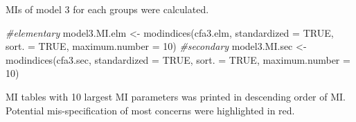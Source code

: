 \documentclass[
]{article}
\newenvironment{Shaded}{\begin{snugshade}}{\end{snugshade}}
\newcommand{\AttributeTok}[1]{\textcolor[rgb]{0.77,0.63,0.00}{#1}}
\newcommand{\CommentTok}[1]{\textcolor[rgb]{0.56,0.35,0.01}{\textit{#1}}}
\newcommand{\ConstantTok}[1]{\textcolor[rgb]{0.00,0.00,0.00}{#1}}
\newcommand{\DecValTok}[1]{\textcolor[rgb]{0.00,0.00,0.81}{#1}}
\newcommand{\FunctionTok}[1]{\textcolor[rgb]{0.00,0.00,0.00}{#1}}
\newcommand{\NormalTok}[1]{#1}
\newcommand{\OtherTok}[1]{\textcolor[rgb]{0.56,0.35,0.01}{#1}}
\begin{document}
MIs of model 3 for each groups were calculated.

\begin{Shaded}
\begin{Highlighting}[]
\CommentTok{\#elementary}
\NormalTok{model3.MI.elm }\OtherTok{\textless{}{-}} 
  \FunctionTok{modindices}\NormalTok{(cfa3.elm,}
             \AttributeTok{standardized =} \ConstantTok{TRUE}\NormalTok{,}
             \AttributeTok{sort. =} \ConstantTok{TRUE}\NormalTok{,}
             \AttributeTok{maximum.number =} \DecValTok{10}\NormalTok{)}
\CommentTok{\#secondary}
\NormalTok{model3.MI.sec }\OtherTok{\textless{}{-}} 
  \FunctionTok{modindices}\NormalTok{(cfa3.sec,}
             \AttributeTok{standardized =} \ConstantTok{TRUE}\NormalTok{,}
             \AttributeTok{sort. =} \ConstantTok{TRUE}\NormalTok{,}
             \AttributeTok{maximum.number =} \DecValTok{10}\NormalTok{)}
\end{Highlighting}
\end{Shaded}

MI tables with 10 largest MI parameters was printed in descending order of MI. Potential mis-specification of most concerns were highlighted in red.
\end{document}
